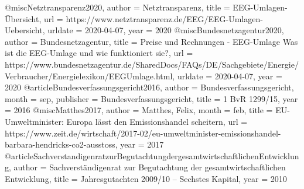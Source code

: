 @misc{Netztransparenz2020,
author = {Netztransparenz},
title = {{EEG-Umlagen-{\"{U}}bersicht}},
url = {https://www.netztransparenz.de/EEG/EEG-Umlagen-Uebersicht},
urldate = {2020-04-07},
year = {2020}
}
@misc{Bundesnetzagentur2020,
author = {Bundesnetzagentur},
title = {{Preise und Rechnungen - EEG-Umlage Was ist die EEG-Umlage und wie funktioniert sie?}},
url = {https://www.bundesnetzagentur.de/SharedDocs/FAQs/DE/Sachgebiete/Energie/Verbraucher/Energielexikon/EEGUmlage.html},
urldate = {2020-04-07},
year = {2020}
}
@article{Bundesverfassungsgericht2016,
author = {Bundesverfassungsgericht},
month = {sep},
publisher = {Bundesverfassungsgericht},
title = {{1 BvR 1299/15}},
year = {2016}
}
@misc{Matthes2017,
author = {Matthes, Felix},
month = {feb},
title = {{EU-Umweltminister: Europa l{\"{a}}sst den Emissionshandel scheitern}},
url = {https://www.zeit.de/wirtschaft/2017-02/eu-umweltminister-emissionshandel-barbara-hendricks-co2-ausstoss},
year = {2017}
}
@article{SachverstandigenratzurBegutachtungdergesamtwirtschaftlichenEntwicklung,
author = {{Sachverst{\"{a}}ndigenrat zur Begutachtung der gesamtwirtschaftlichen Entwicklung}},
title = {{Jahresgutachten 2009/10 – Sechstes Kapital}},
year = {2010}
}



